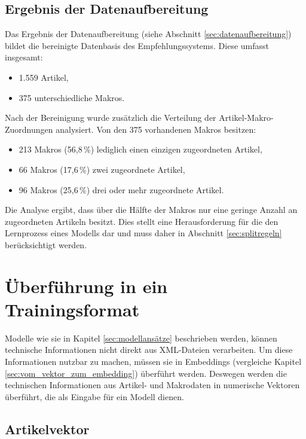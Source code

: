 \subsection{Ergebnis der Datenaufbereitung}
\label{sec:ergebnis_der_datenaufbereitung}

Das Ergebnis der Datenaufbereitung (siehe Abschnitt \ref{sec:datenaufbereitung}) bildet die bereinigte Datenbasis des Empfehlungssystems. 
Diese umfasst insgesamt: 

\begin{itemize} 
    \item 1.559 Artikel, 
    \item 375 unterschiedliche Makros. 
\end{itemize}

Nach der Bereinigung wurde zusätzlich die Verteilung der Artikel-Makro-Zuordnungen analysiert. Von den 375 vorhandenen Makros besitzen:

\begin{itemize} 
    \item 213 Makros (56,8\,\%) lediglich einen einzigen zugeordneten Artikel, 
    \item 66 Makros (17,6\,\%) zwei zugeordnete Artikel,
    \item 96 Makros (25,6\,\%) drei oder mehr zugeordnete Artikel.
\end{itemize} 

Die Analyse ergibt, dass über die Hälfte der Makros nur eine geringe Anzahl an zugeordneten Artikeln besitzt. 
Dies stellt eine Herausforderung für die den Lernprozess eines Modells dar und muss daher in Abschnitt \ref{sec:splitregeln} berücksichtigt werden.

\section{Überführung in ein Trainingsformat} 

Modelle wie sie in Kapitel \ref{sec:modellansätze} beschrieben werden, können technische Informationen nicht direkt aus XML-Dateien verarbeiten. 
Um diese Informationen nutzbar zu machen, müssen sie in Embeddings (vergleiche Kapitel \ref{sec:vom_vektor_zum_embedding}) überführt werden.
Deswegen werden die technischen Informationen aus Artikel- und Makrodaten in numerische Vektoren überführt, die als Eingabe für ein Modell dienen.


\subsection{Artikelvektor} 

